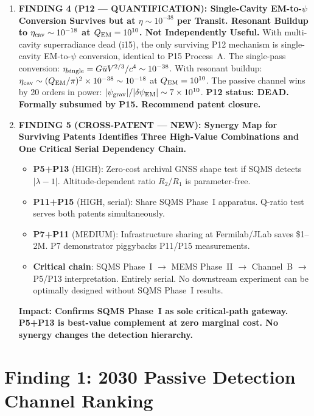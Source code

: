 \documentclass[11pt]{article}
\newcommand{\ee}[1]{\times 10^{#1}}
\begin{document}
\begin{tcolorbox}[colback=blue!5!white, colframe=blue!60!black,
  title=\textbf{W4i16 TOP 5 FINDINGS --- Ranked by Programme Impact}]
\begin{enumerate}
\item \textbf{FINDING 4 (P12 --- QUANTIFICATION): Single-Cavity
  EM-to-$\psi$ Conversion Survives but at $\eta \sim 10^{-38}$ per
  Transit. Resonant Buildup to $\eta_{\rm cav} \sim 10^{-18}$ at
  $Q_{\rm EM} = 10^{10}$. Not Independently Useful.}
  With multi-cavity superradiance dead (i15), the only
  surviving P12 mechanism is single-cavity EM-to-$\psi$ conversion,
  identical to P15 Process~A. The single-pass conversion:
  $\eta_{\rm single} = G \bar{u} V^{2/3}/c^4 \sim 10^{-38}$.
  With resonant buildup: $\eta_{\rm cav} \sim (Q_{\rm EM}/\pi)^2
  \times 10^{-38} \sim 10^{-18}$ at $Q_{\rm EM} = 10^{10}$.
  The passive channel wins by 20 orders in power:
  $|\psi_{\rm grav}|/|\delta\psi_{\rm EM}| \sim 7\ee{10}$.
  \textbf{P12 status: DEAD. Formally subsumed by P15. Recommend
  patent closure.}

\item \textbf{FINDING 5 (CROSS-PATENT --- NEW): Synergy Map for Surviving
  Patents Identifies Three High-Value Combinations and One Critical
  Serial Dependency Chain.}
  \begin{itemize}[nosep]
    \item \textbf{P5+P13} (HIGH): Zero-cost archival GNSS shape test
      if SQMS detects $|\lambda-1|$. Altitude-dependent ratio
      $R_2/R_1$ is parameter-free.
    \item \textbf{P11+P15} (HIGH, serial): Share SQMS Phase~I apparatus.
      Q-ratio test serves both patents simultaneously.
    \item \textbf{P7+P11} (MEDIUM): Infrastructure sharing at Fermilab/JLab
      saves \$1--2M. P7 demonstrator piggybacks P11/P15 measurements.
    \item \textbf{Critical chain}: SQMS Phase~I $\to$ MEMS Phase~II
      $\to$ Channel~B $\to$ P5/P13 interpretation. Entirely serial.
      No downstream experiment can be optimally designed without
      SQMS Phase~I results.
  \end{itemize}
  \textbf{Impact: Confirms SQMS Phase~I as sole critical-path gateway.
  P5+P13 is best-value complement at zero marginal cost. No synergy
  changes the detection hierarchy.}

\end{enumerate}
\end{tcolorbox}


\part{Finding 1: 2030 Passive Detection Channel Ranking}
\label{part:passive-ranking}
\end{document}

